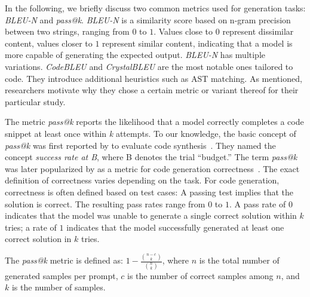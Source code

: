 In the following, we briefly discuss two common metrics used for generation tasks: \emph{BLEU-N} and \emph{pass@k}.
\emph{BLEU-N} \cite{DBLP:conf/acl/PapineniRWZ02} is a similarity score based on n-gram precision between two strings, ranging from $0$ to $1$.
Values close to $0$ represent dissimilar content, values closer to $1$ represent similar content, indicating that a model is more capable of generating the expected output. %
\emph{BLEU-N} has multiple variations.
\emph{CodeBLEU} \cite{DBLP:journals/corr/abs-2009-10297} and \emph{CrystalBLEU} \cite{DBLP:conf/kbse/EghbaliP22} are the most notable ones tailored to code.
They introduce additional heuristics such as AST matching.
As mentioned, researchers \must motivate why they chose a certain metric or variant thereof for their particular study.

The metric \emph{pass@k} reports the likelihood that a model correctly completes a code snippet at least once within \emph{k} attempts.
To our knowledge, the basic concept of \emph{pass@k} was first reported by \citeauthor{DBLP:journals/corr/abs-1906-04908} to evaluate code synthesis~\cite{DBLP:journals/corr/abs-1906-04908}.
They named the concept \emph{success rate at B}, where B denotes the trial ``budget.''
The term \emph{pass@k} was later popularized by \citeauthor{DBLP:journals/corr/abs-2107-03374} as a metric for code generation correctness~\cite{DBLP:journals/corr/abs-2107-03374}.
The exact definition of correctness varies depending on the task.
For code generation, correctness is often defined based on test cases: A passing test implies that the solution is correct.
The resulting pass rates range from $0$ to $1$.
A pass rate of $0$ indicates that the model was unable to generate a single correct solution within $k$ tries; a rate of $1$ indicates that the model successfully generated at least one correct solution in $k$ tries.

The \emph{pass@k} metric is defined as:
$1 - \frac{\binom{n-c}{k}}{\binom{n}{k}}$, where $n$ is the total number of generated samples per prompt, $c$ is the number of correct samples among  $n$, and $k$ is the number of samples.

